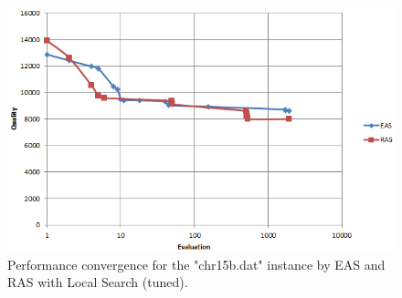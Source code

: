 \documentclass[12pt]{article}
\begin{document}
\begin{figure}[H]
  \centering
    \includegraphics[scale=0.9]{ls-tuned.PNG}
  \caption{Performance convergence for the "chr15b.dat" instance by EAS and RAS with Local Search (tuned).}
  \label{fig:convergence-ls-tuned}
\end{figure}
\end{document}
